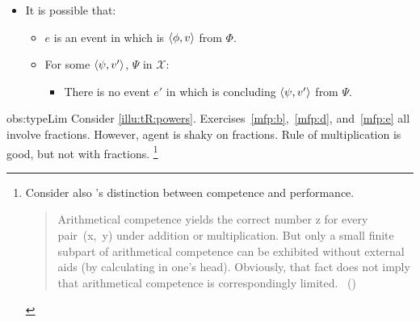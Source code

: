 \begin{note}
  \begin{observation}
    \label{obs:typeLim}

    \begin{itemize}
    \item
      It is possible that:
      \begin{itemize}
      \item
        \(e\) is an event in which \vAgent{} is \tCV{} \(\langle \phi, v \rangle\) from \(\Phi\).
      \item
        For some \(\langle \psi, v' \rangle\), \(\Psi\) in \(\mathcal{X}\):
        \begin{itemize}
        \item
          There is no event \(e'\) in which \vAgent{} is concluding \(\langle \psi, v' \rangle\) from \(\Psi\).
        \end{itemize}
      \end{itemize}
    \end{itemize}

    \vspace{-\baselineskip}
  \end{observation}

  \begin{motivation}{obs:typeLim}
    Consider \autoref{illu:tR:powers}.
    Exercises~\ref{mfp:b},~\ref{mfp:d}, and~\ref{mfp:e} all involve fractions.
    However, agent is shaky on fractions.
    Rule of multiplication is good, but not with fractions.%
  \footnote{
    Consider also \citeauthor{Chomsky:2015aa}'s distinction between competence and performance.

    \begin{quote}
      Arithmetical competence yields the correct number z for every pair~(x,~y) under addition or multiplication.
      But only a small finite subpart of arithmetical competence can be exhibited without external aids (by calculating in one's head).
      Obviously, that fact does not imply that arithmetical competence is correspondingly limited.%
      \mbox{ }\hfill\mbox{(\citeyear[xii]{Chomsky:2015aa})}
    \end{quote}

}
\end{motivation}
\end{note}
